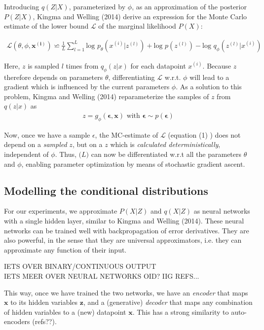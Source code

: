 \documentclass{article}
\begin{document}
Introducing $q(Z|X)$, parameterized by $\phi$, as an approximation of the posterior $P(Z|X)$, Kingma and Welling (2014) derive an expression for the Monte Carlo estimate of the lower bound $\mathcal{L}$ of the marginal likelihood $P(X)$:

\begin{align}
\mathcal{L}(\theta ,\phi ,  \mathbf{x^{(i)}}) \backsimeq \frac{1}{L} \sum_{l=1}^{L} \text{log } p_{\theta} (x^{(i)}|z^{(l)})+ \text{log }p(z^{(l)}	)-\text{log }q_{\phi}(z^{(l)}|x^{(i)})
\end{align}

Here, $z$ is sampled $l$ times from $q_{\phi}(z|x)$ for each datapoint $x^{(i)}$. Because $z$ therefore depends on parameters $\theta$, differentiating $\mathcal{L}$ w.r.t. $\phi$ will lead to a gradient which is influenced by the current parameters $\phi$. 
As a solution to this problem, Kingma and Welling (2014) reparameterize the samples of $z$ from $q(z|x)$ as
\begin{align}
z = g_\phi(\mathbf{\epsilon},\mathbf{x}) \text{  with  } \mathbf{\epsilon} \sim p(\mathbf{\epsilon}) 
\end{align} 

Now, once we have a sample $\epsilon$, the MC-estimate of $\mathcal{L}$ (equation (1) ) does not depend on a \textit{sampled} $z$, but on a  $z$ which is \textit{calculated deterministically}, independent of $\phi$. Thus, $\mathcal(L)$ can now be differentiated w.r.t all the parameters $\theta$ and $\phi$, enabling parameter optimization by means of stochastic gradient ascent.

\subsection{Modelling the conditional distributions}

For our experiments, we approximate $P(X|Z)$ and $q(X|Z)$ as neural networks with a single hidden layer, similar to Kingma and Welling (2014). These neural networks can be trained well with backpropagation of error derivatives. They are also powerful, in the sense that they are universal approximators, i.e. they can approximate any function of their input. 

IETS OVER BINARY/CONTINUOUS OUTPUT \\
IETS MEER OVER NEURAL NETWORKS OID? IIG REFS...

This way, once we have trained the two networks, we have an \textit{encoder} that maps $\mathbf{x}$ to its hidden variables $\mathbf{z}$, and a (generative) \textit{decoder} that maps any combination of hidden variables to a (new) datapoint $\mathbf{x}$. This has a strong similarity to auto-encoders (refs??). 
\end{document}
